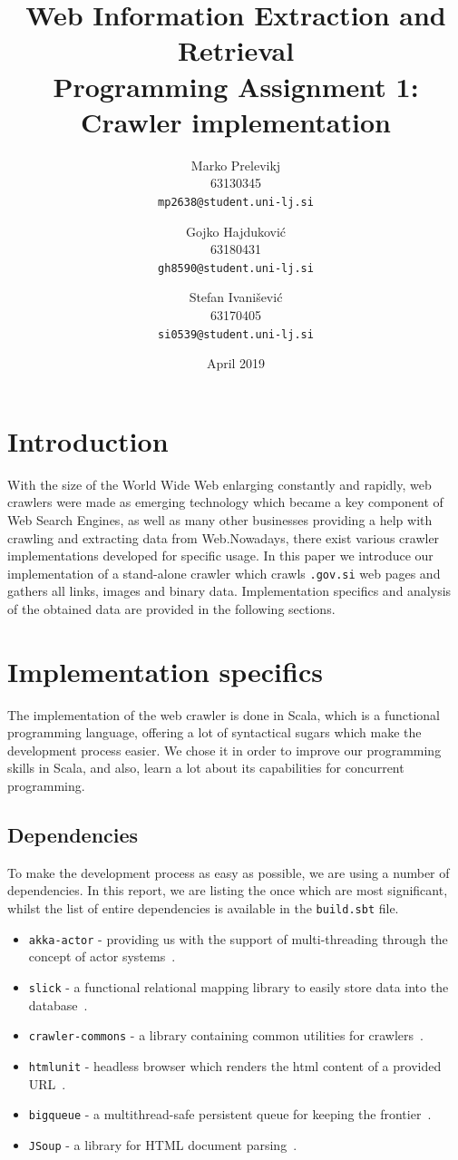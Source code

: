 \documentclass{article}
\title{
	Web Information Extraction and Retrieval\\
	Programming Assignment 1: \\
	Crawler implementation
}
\author{
  Marko Prelevikj\\
  63130345\\
  \texttt{mp2638@student.uni-lj.si}
  \and
  Gojko Hajduković\\
  63180431\\
  \texttt{gh8590@student.uni-lj.si}
  \and
  Stefan Ivanišević\\
  63170405\\
  \texttt{si0539@student.uni-lj.si}
}
\date{April 2019}
\begin{document}
\maketitle

\section{Introduction}
With the size of the World Wide Web enlarging constantly and rapidly, web crawlers were made as emerging technology which became a key component of Web Search Engines, as well as many other businesses providing a help with crawling and extracting data from Web.Nowadays, there exist various crawler implementations developed for specific usage. In this paper we introduce our implementation of a stand-alone crawler which crawls \texttt{.gov.si} web pages and gathers all links, images and binary data. Implementation specifics and analysis of the obtained data are provided in the following sections.

\section{Implementation specifics}

The implementation of the web crawler is done in Scala, which is a functional programming language, offering a lot of syntactical sugars which make the development process easier.
We chose it in order to improve our programming skills in Scala, and also, learn a lot about its capabilities for concurrent programming.

\subsection{Dependencies}

To make the development process as easy as possible, we are using a number of dependencies. In this report, we are listing the once which are most significant, whilst the list of entire dependencies is available in the \texttt{build.sbt} file. 
\begin{itemize}
	\item \texttt{akka-actor} - providing us with the support of multi-threading through the concept of actor systems~\cite{Akka:ActorSystem}.
	\item \texttt{slick} - a functional relational mapping library to easily store data into the database~\cite{Slick}.
	\item \texttt{crawler-commons} - a library containing common utilities for crawlers~\cite{Crawler-commons}.
	\item \texttt{htmlunit} - headless browser which renders the html content of a provided URL~\cite{htmlunit}.
	\item \texttt{bigqueue} - a multithread-safe persistent queue for keeping the frontier~\cite{bigqueue}.
	\item \texttt{JSoup} - a library for HTML document parsing~\cite{jsoup}.
\end{itemize}
\end{document}
